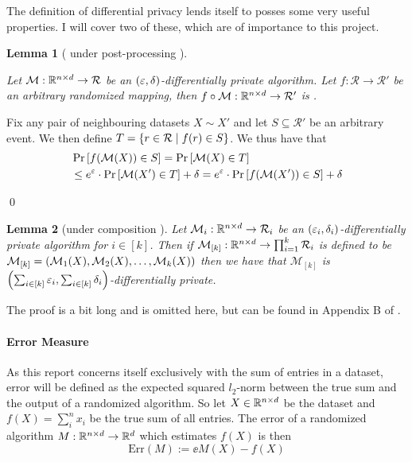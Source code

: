 \documentclass[a4paper,12pt]{article}
\renewenvironment{proof}{{\textit{Proof} \\}}{\qed}
\newtheorem{lemma}{Lemma}[section]
\begin{document}
\noindent The definition of differential privacy lends itself to posses some very useful properties.
I will cover two of these, which are of importance to this project.

\begin{lemma}[ \edp under post-processing ] %
\label{lem:PostProc}

Let $\mathcal{M}: \mathbb{R}^{n \times d} \rightarrow \mathcal{R}$ be an $\left (\varepsilon, \delta\right)$-differentially private 
algorithm. Let $f: \mathcal{R} \rightarrow \mathcal{R}'$ 
be an arbitrary randomized mapping, then 
$f \circ \mathcal{M}: \mathbb{R}^{n \times d} \rightarrow \mathcal{R}'$ is \edp.

\end{lemma}

\begin{proof}

Fix any pair of neighbouring datasets $X \sim X'$ and 
let $S \subseteq \mathcal{R}'$ be an arbitrary event. We then define 
$T = \left \{ r \in \mathcal{R} \; \text{\textbar} \; f(r) \in S\right\}$.
We thus have that
\begin{align*}
    &\Pr\left [f(\mathcal{M}(X)) \in S \right] = \Pr\left [\mathcal{M}(X) \in T \right] \\
    &\le e^{\varepsilon} \cdot \Pr\left [\mathcal{M}(X') \in T \right] + \delta = 
    e^{\varepsilon} \cdot \Pr\left [f(\mathcal{M}(X')) \in S \right] + \delta
\end{align*}
    
\end{proof}



\begin{lemma}[\edp under composition  ] %
Let $\mathcal{M}_i: \mathbb{R}^{n \times d} \rightarrow \mathcal{R}_i$ be an $\left (\varepsilon_i, \delta_i\right)$-differentially private algorithm
for $i \in [k]$. Then if $\mathcal{M}_{[k]} : \mathbb{R}^{n \times d} \rightarrow \prod_{i=1}^{k} \mathcal{R}_i$ is defined to be
$\mathcal{M}_{[k]} = \left (\mathcal{M}_1(X), \mathcal{M}_2(X), \dots, \mathcal{M}_{k}(X)\right)$ then we have that
$\mathcal{M}_{[k]}$ is $\left ( \sum_{i \in [k]} \varepsilon_i , \sum_{i \in [k]} \delta_i \right)$-differentially private.
\end{lemma}
\noindent The proof is a bit long and is omitted here, but can be found in Appendix B of \cite{dpbasic}.



\paragraph{Error Measure}
As this report concerns itself exclusively with the sum of entries 
in a dataset, error will be defined as the expected
squared $l_2$-norm between the true sum and 
the output of a randomized algorithm.
So let $X \in \mathbb{R}^{n \times d}$ be the dataset and
$f(X) = \sum_i^n x_i$ be the true sum of all entries. The error of a
randomized algorithm $M : \mathbb{R}^{n \times d} \rightarrow \mathbb{R}^d$
which estimates $f(X)$ is then 
\[
    \text{Err}(M) := \ee{M(X) - f(X)}
\]
\end{document}
